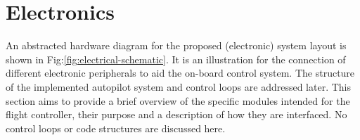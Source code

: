 \section{Electronics}
\label{sec:proto.layout}
{\centering
\vspace{-20pt}
\begin{minipage}{\textwidth}
\centering
{}
\end{minipage}
\vspace{-10pt}
\label{fig:electrical-schematic}
}
\newpage
An abstracted hardware diagram for the proposed (electronic) system layout is shown in Fig:\ref{fig:electrical-schematic}. It is an illustration for the connection of different electronic peripherals to aid the on-board control system. The structure of the implemented autopilot system and control loops are addressed later. This section aims to provide a brief overview of the specific modules intended for the flight controller, their purpose and a description of how they are interfaced. No control loops or code structures are discussed here.
